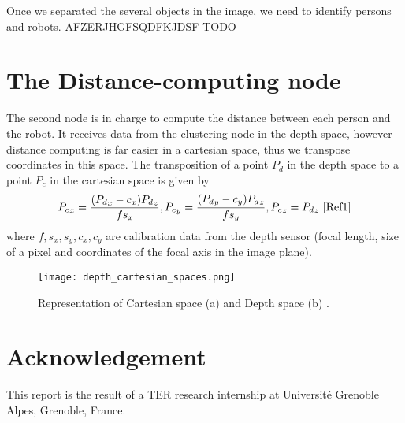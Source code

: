 \documentclass[smallextended]{svjour3}
\begin{document}
Once we separated the several objects in the image, we need to identify persons and robots. AFZERJHGFSQDFKJDSF TODO

\section{The Distance-computing node}

The second node is in charge to compute the distance between each person and the robot. It receives data from the clustering node in the depth space, however distance computing is far easier in a cartesian space, thus we transpose coordinates in this space. The transposition of a point $P_d$ in the depth space to a point $P_c$ in the cartesian space is given by \[{P_c}_x = \frac{({P_d}_x-c_x){P_d}_z}{fs_x}, {P_c}_y = \frac{({P_d}_y-c_y){P_d}_z}{fs_y}, {P_c}_z = {P_d}_z \text{ \cite{Ref1}} \]
where $f,s_x,s_y,c_x,c_y$ are calibration data from the depth sensor (focal length, size of a pixel and coordinates of the focal axis in the image plane).

\begin{figure}
\centering
\texttt{[image: depth\_cartesian\_spaces.png]}
\caption{\label{fig:spaces}Representation of Cartesian space (a) and Depth space (b) \cite{Ref1}.}
\end{figure}

\section*{Acknowledgement}
This report is the result of a TER research internship at Université Grenoble Alpes, Grenoble, France.




\end{document}
